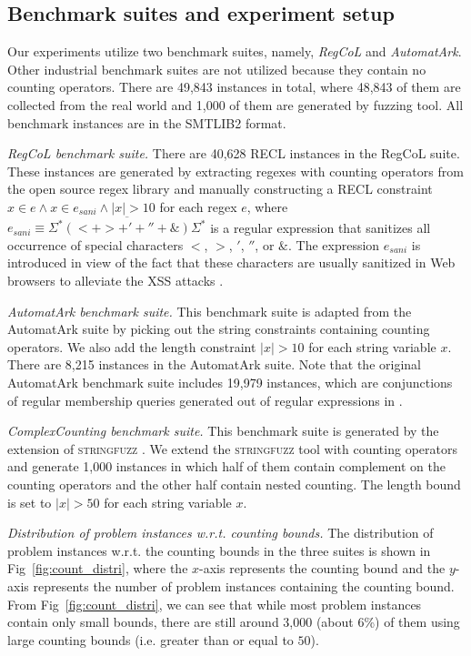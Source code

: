 \subsection{Benchmark suites and experiment setup}\label{sec:bench}

Our experiments utilize two benchmark suites, namely, \emph{RegCoL} and \emph{AutomatArk}. Other industrial benchmark suites are not utilized because they contain no counting operators. There are 49,843 instances in total, where 48,843 of them are collected from the real world and 1,000 of them are generated by fuzzing tool. All benchmark instances are in the SMTLIB2 format.

\medskip
\noindent
\emph{RegCoL benchmark suite.} There are 40,628 RECL instances in the RegCoL suite. These instances are generated by extracting regexes with counting operators from the open source regex library \cite{regex_lingua_franca,redos_lenka} and manually constructing a RECL constraint $x \in e \wedge x \in e_{sani} \wedge |x| > 10$ for each regex $e$,
where $e_{sani} \equiv \overline{\Sigma^*(<+ >+'+''+\&)\Sigma^*}$ is a regular expression that sanitizes all occurrence of special characters $<$, $>$, $'$, $''$, or $\&$. 
The expression $e_{sani}$ is introduced in view of the fact that these characters are usually sanitized in Web browsers to alleviate the XSS attacks \cite{malware_detection_3_kudzu,CCH_18}.

\medskip
\noindent
\emph{AutomatArk benchmark suite.}
This benchmark suite is adapted from the AutomatArk suite \cite{z3str3re} by picking out the string constraints containing counting operators. We also add the length constraint $|x| > 10$ for each string variable $x$. There are 8,215 instances in the AutomatArk suite.
Note that the original AutomatArk benchmark suite \cite{z3str3re} includes 19,979 instances, which are conjunctions of regular membership queries generated out of regular expressions in \cite{automatark}.

\medskip
\noindent
\emph{ComplexCounting benchmark suite.} This benchmark suite is generated by the extension of \textsc{stringfuzz} \cite{stringfuzz}. We extend the \textsc{stringfuzz} tool with counting operators and generate 1,000 instances in which half of them contain complement on the counting operators and the other half contain nested counting. The length bound is set to $|x| > 50$ for each string variable $x$.

\medskip
\noindent
\emph{Distribution of problem instances w.r.t. counting bounds. }
The distribution of problem instances w.r.t. the counting bounds in the three suites is shown in Fig~\ref{fig:count_distri}, where the $x$-axis represents the counting bound and the $y$-axis represents the number of problem instances containing the counting bound. 
From Fig~\ref{fig:count_distri}, we can see that while most problem instances contain only small bounds, there are still around 3,000  (about 6\%) of them using large counting bounds (i.e. greater than or equal to $50$).

